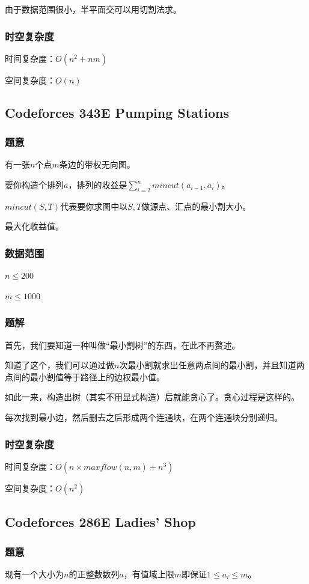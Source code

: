 \documentclass{ctexart}
\begin{document}
由于数据范围很小，半平面交可以用切割法求。
\subsubsection{时空复杂度}
时间复杂度：$O(n^2+nm)$

空间复杂度：$O(n)$
\subsection{Codeforces 343E Pumping Stations}
\subsubsection{题意}
有一张$n$个点$m$条边的带权无向图。

要你构造个排列$a$，排列的收益是$\sum_{i=2}^n mincut(a_{i-1},a_i)$。

$mincut(S,T)$代表要你求图中以$S,T$做源点、汇点的最小割大小。

最大化收益值。
\subsubsection{数据范围}
$n \le 200$

$m \le 1000$
\subsubsection{题解}
首先，我们要知道一种叫做“最小割树”的东西，在此不再赘述。

知道了这个，我们可以通过做$n$次最小割就求出任意两点间的最小割，并且知道两点间的最小割值等于路径上的边权最小值。

如此一来，构造出树（其实不用显式构造）后就能贪心了。贪心过程是这样的。

每次找到最小边，然后删去之后形成两个连通块，在两个连通块分别递归。
\subsubsection{时空复杂度}
时间复杂度：$O(n\times maxflow(n,m)+n^3)$

空间复杂度：$O(n^2)$
\subsection{Codeforces 286E Ladies' Shop}
\subsubsection{题意}
现有一个大小为$n$的正整数数列$a$，有值域上限$m$即保证$1 \le a_i \le m$。
\end{document}
